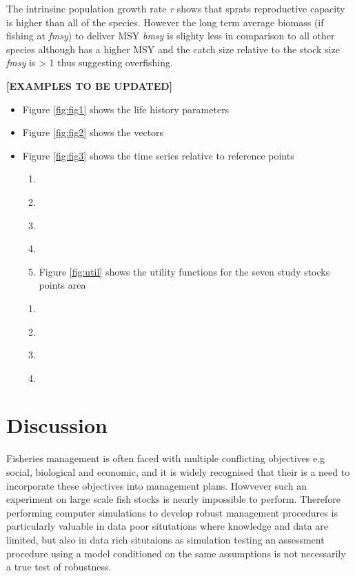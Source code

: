 \documentclass[preprint,12pt]{elsarticle}
\begin{document}
The intrinsinc population growth rate \textit{r} shows that sprats reproductive capacity is higher than all of the species. However the long term average biomass (if fishing at \textit{fmsy}) to deliver MSY \textit{bmsy} is slighty less in comparison to all other species although has a higher MSY and the catch size relative to the stock size \textit{fmsy} is > 1 thus suggesting overfishing. 


\textbf{[EXAMPLES TO BE UPDATED]}
\begin{itemize}
\item Figure \ref{fig:fig1} shows the life history parameters
\item Figure \ref{fig:fig2} shows the vectors
\item Figure \ref{fig:fig3} shows the time series relative to reference points
\begin{enumerate}
 \item ~
 \item ~
 \item ~
 \item ~\item Figure \ref{fig:util} shows the utility functions for the seven study stocks points area
\end{enumerate}
\begin{enumerate}
 \item ~
 \item ~
 \item ~
 \item ~
\end{enumerate}

\end{itemize}

\section{Discussion}

Fisheries management is often faced with multiple conflicting objectives e.g social, biological and economic, and it is widely recognised that their is a need to incorporate these objectives into management plans. Howvever such an experiment on large scale fish stocks is nearly impossible to perform.  Therefore performing computer simulations to develop robust management procedures is particularly valuable in data poor situtations where knowledge and data are limited, but also in data rich situtaions as simulation testing an assessment procedure using a model conditioned on the same assumptions is not necessarily a true test of robustness.  
\end{document}
